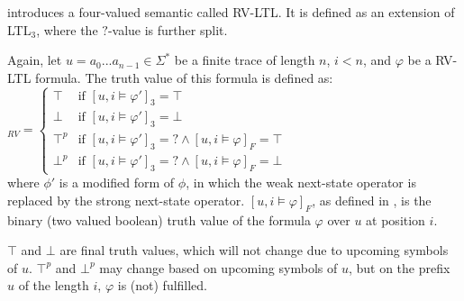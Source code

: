 		\cite{10.1007/978-3-540-77395-5_11} introduces a four-valued semantic called RV-LTL. It is defined as an extension of LTL$_3$, where the $?$-value is further split.
		\begin{definition}[RV-LTL]
			Again, let $u=a_0...a_{n-1}\in\Sigma^*$ be a finite trace of length $n$, $i < n$, and $\varphi$ be a RV-LTL formula. The truth value of this formula is defined as:\\
			\begin{math}
				[u,i\models\varphi]_{RV}=
					\begin{cases}
						\top & \text{if } [u, i\vDash \varphi']_3=\top\\
						\bot & \text{if } [u, i\vDash \varphi']_3=\bot\\
						\top^p & \text{if } [u, i\vDash \varphi']_3= ? \land [u,i\vDash\varphi]_F=\top\\
						\bot^p & \text{if } [u, i\vDash \varphi']_3= ? \land [u,i\vDash\varphi]_F=\bot
					\end{cases}
			\end{math}\\
			where $\phi'$ is a modified form of $\phi$, in which the weak next-state operator is replaced by the strong next-state operator. $[u,i\vDash\varphi]_F$, as defined in \cite{10.1007/3-540-15648-8_16}, is the binary (two valued boolean) truth value of the formula $\varphi$ over $u$ at position $i$.
		\end{definition}
		$\top$ and $\bot$ are final truth values, which will not change due to upcoming symbols of $u$. $\top^p$ and $\bot^p$ may change based on upcoming symbols of $u$, but on the prefix $u$ of the length $i$, $\varphi$ is (not) fulfilled. 
	
	
